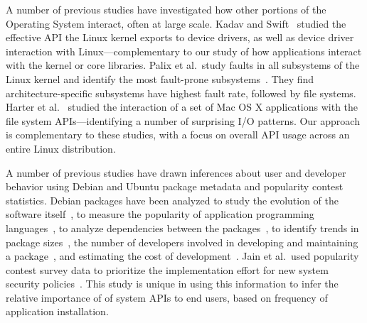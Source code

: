 A number of previous studies have investigated how other portions of the Operating System
interact, often at large scale.
Kadav and Swift~\citep{understand-drivers} studied the effective API the Linux kernel exports 
to device drivers, as well as device driver interaction with Linux---complementary to our study
of how applications interact with the kernel or core libraries.
Palix et al.\ study faults in all subsystems of the Linux kernel and identify the 
most fault-prone subsystems~\citep{linux-faults}.
They find architecture-specific subsystems have highest fault rate, followed by file systems.
Harter et al.~\citep{file-not-file} studied
 the interaction of a set of Mac OS X applications with the file system APIs---identifying a number
of surprising I/O patterns.
Our approach is complementary to these studies, with a focus on overall API 
usage across an entire Linux distribution.




A number of previous studies have drawn inferences about user and developer behavior
using Debian and Ubuntu package metadata and popularity contest statistics.
Debian packages have been analyzed to study the evolution 
of the software itself~\citep{macro-study, life-death, mining-over-time}, 
to measure the popularity of application programming 
languages~\citep{upgrade-libre}, to analyze dependencies between the packages~\citep{package-dependency}, 
to identify trends in package sizes~\citep{pigs-to-stripes}, 
the number of developers involved in developing and maintaining a package~\citep{toy-story},
and estimating the cost of development~\citep{measuring-woody}.
Jain et al.\ used popularity contest survey data to 
prioritize the implementation effort for new system security policies~\citep{jain14setuid}. %
This study is unique in using this information to infer the relative importance of 
of system APIs to end users, based on frequency of application installation.

